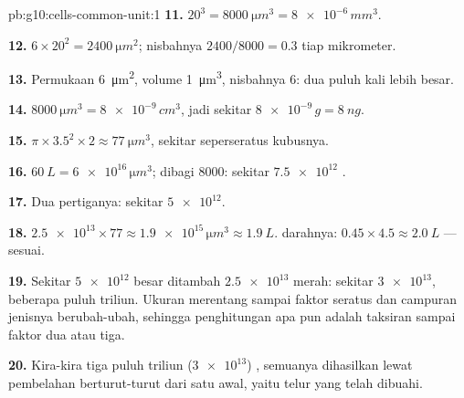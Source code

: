 \begin{solution}{pb:g10:cells-common-unit:1}
\textbf{11.} $20^3 = \qty{8000}{\micro m^3} = \num{8e-6}\,\unit{mm^3}$.

\textbf{12.} $6 \times 20^2 = \qty{2400}{\micro m^2}$; nisbahnya
$2400/8000 = 0.3$ tiap mikrometer.

\textbf{13.} Permukaan \qty{6}{\micro m^2}, volume \qty{1}{\micro m^3},
nisbahnya 6: dua puluh kali lebih besar.

\textbf{14.} $\qty{8000}{\micro m^3} = \num{8e-9}\,\unit{cm^3}$, jadi
sekitar $\num{8e-9}\,\unit{g} = \qty{8}{ng}$.

\textbf{15.} $\pi \times 3.5^2 \times 2 \approx \qty{77}{\micro m^3}$,
sekitar seperseratus kubusnya.

\textbf{16.} $\qty{60}{L} = \num{6e16}\,\unit{\micro m^3}$; dibagi
8000: sekitar $\num{7.5e12}$ .

\textbf{17.} Dua pertiganya: sekitar $\num{5e12}$.

\textbf{18.} $\num{2.5e13} \times 77 \approx \num{1.9e15}\,\unit{\micro
m^3} \approx \qty{1.9}{L}$.  darahnya: $0.45 \times 4.5 \approx
\qty{2.0}{L}$ --- sesuai.

\textbf{19.} Sekitar $\num{5e12}$  besar ditambah $\num{2.5e13}$ 
merah: sekitar $\num{3e13}$, beberapa puluh triliun. Ukuran 
merentang sampai faktor seratus dan campuran jenisnya berubah-ubah,
sehingga penghitungan apa pun adalah taksiran sampai faktor dua atau tiga.

\textbf{20.} Kira-kira tiga puluh triliun ($\num{3e13}$) , semuanya
dihasilkan lewat pembelahan  berturut-turut dari satu  awal,
yaitu  telur yang telah dibuahi.
\end{solution}
